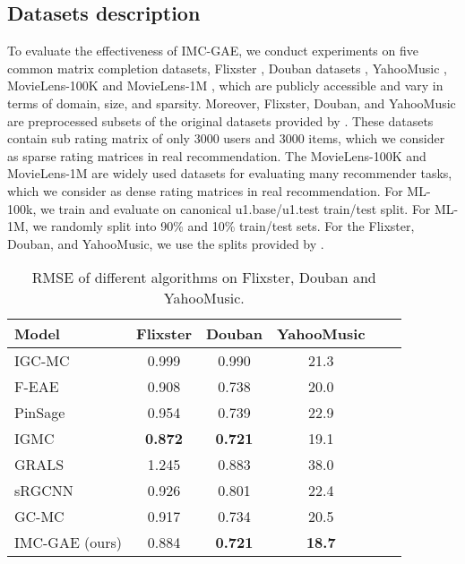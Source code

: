 \documentclass[sigconf]{acmart}
\begin{document}
\subsection{Datasets description}
To evaluate the effectiveness of IMC-GAE, we conduct experiments on five common matrix completion datasets, Flixster \cite{jamali2010matrix}, Douban datasets \cite{ma2011recommender}, YahooMusic \cite{dror2012yahoo}, MovieLens-100K \cite{miller2003movielens} and MovieLens-1M \cite{miller2003movielens}, which are publicly accessible and vary in terms of domain, size, and sparsity. Moreover, Flixster, Douban, and YahooMusic are preprocessed subsets of the original datasets provided by \cite{monti2017geometric}. These datasets contain sub rating matrix of only 3000 users and 3000 items, which we consider as sparse rating matrices in real recommendation. The MovieLens-100K and MovieLens-1M are widely used datasets for evaluating many recommender tasks, which we consider as dense rating matrices in real recommendation. For ML-100k, we train and evaluate on canonical u1.base/u1.test train/test split. For ML-1M, we randomly split into 90\% and 10\% train/test sets. For the Flixster, Douban, and YahooMusic, we use the splits provided by \cite{monti2017geometric}. 

\begin{table}
  \caption{RMSE of different algorithms on Flixster, Douban and YahooMusic.}
  \label{tab:rmse_spare}
  \begin{tabular}{lccccc}
    \toprule
    \textbf{Model} &\textbf{Flixster}&\textbf{Douban}&\textbf{YahooMusic}\\
    \midrule
    IGC-MC  & 0.999 & 0.990 & 21.3\\
    F-EAE & 0.908 & 0.738 & 20.0\\
    PinSage & 0.954 & 0.739 & 22.9\\
    IGMC &\textbf{0.872} & \textbf{0.721} & 19.1\\
    \midrule
    GRALS  & 1.245 & 0.883 & 38.0\\
    sRGCNN & 0.926 & 0.801 & 22.4\\
    GC-MC & 0.917 & 0.734 & 20.5\\
    IMC-GAE (ours) & 0.884 & \textbf{0.721} & \textbf{18.7}\\
  \bottomrule
\end{tabular}
\end{table}
\end{document}
